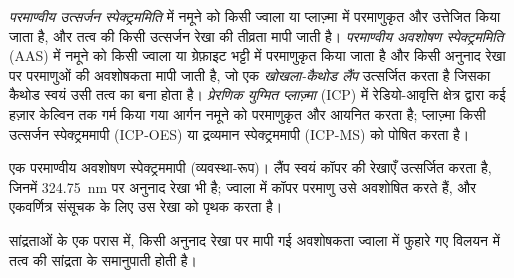 \begin{definition}\label{def:b2:mass-spec-atomic:atomic}
\emph{परमाण्वीय उत्सर्जन स्पेक्ट्रममिति} में नमूने को किसी ज्वाला या प्लाज़्मा में
परमाणुकृत और उत्तेजित किया जाता है, और तत्व की किसी उत्सर्जन रेखा की तीव्रता मापी जाती है।
\emph{परमाण्वीय अवशोषण स्पेक्ट्रममिति} (AAS) में नमूने को
किसी ज्वाला या ग्रेफ़ाइट भट्टी में परमाणुकृत किया जाता है और किसी अनुनाद रेखा पर परमाणुओं की अवशोषकता मापी जाती है,
जो एक \emph{खोखला-कैथोड लैंप} उत्सर्जित करता है जिसका कैथोड
स्वयं उसी तत्व का बना होता है। \emph{प्रेरणिक युग्मित प्लाज़्मा} (ICP) में
रेडियो-आवृत्ति क्षेत्र द्वारा कई हज़ार केल्विन तक गर्म किया गया आर्गन नमूने को परमाणुकृत और आयनित करता है;
प्लाज़्मा किसी उत्सर्जन स्पेक्ट्रममापी (ICP-OES) या द्रव्यमान स्पेक्ट्रममापी (ICP-MS) को पोषित करता है।
\end{definition}

\begin{omfigure}
\par\vspace{4pt}

{\small एक परमाण्वीय अवशोषण स्पेक्ट्रममापी (व्यवस्था-रूप)। लैंप स्वयं कॉपर की रेखाएँ उत्सर्जित करता है, जिनमें
\qty{324.75}{nm} पर अनुनाद रेखा भी है; ज्वाला में कॉपर परमाणु उसे अवशोषित करते हैं, और
एकवर्णित्र संसूचक के लिए उस रेखा को पृथक करता है।}
\end{omfigure}

\begin{proposition}\label{prop:b2:mass-spec-atomic:aas}
सांद्रताओं के एक परास में, किसी अनुनाद रेखा पर मापी गई अवशोषकता ज्वाला में फुहारे गए विलयन में तत्व की
सांद्रता के समानुपाती होती है।
\end{proposition}

